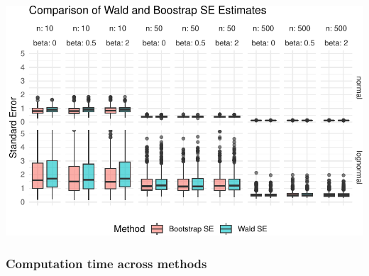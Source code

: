\documentclass[
]{article}
\begin{document}
\begin{center}\includegraphics[width=1\linewidth]{HW1_report_files/figure-latex/unnamed-chunk-5-1} \end{center}

\subsubsection{Computation time across
methods}\label{computation-time-across-methods}
\end{document}
